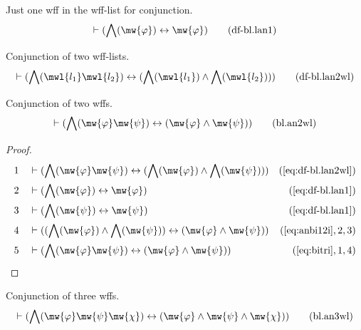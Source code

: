 \begin{metadefinition} {Just one wff in the wff-list for
conjunction.}
\begin{align}
\vdash ( \bigwedge( \mw{\varphi} ) \leftrightarrow \mw{\varphi}
    )\label{eq:df-bl.lan1}\tag{df-bl.lan1}
\end{align}
\end{metadefinition}


\begin{metadefinition} {Conjunction of two wff-lists.}
\begin{align}
\vdash ( \bigwedge( \mwl{l_1} \mwl{l_2} ) \leftrightarrow ( \bigwedge(
    \mwl{l_1} ) \wedge \bigwedge( \mwl{l_2} ) )
    )\label{eq:df-bl.lan2wl}\tag{df-bl.lan2wl}
\end{align}
\end{metadefinition}


\begin{lemma} {Conjunction of two wffs.}
\begin{align}
\vdash ( \bigwedge( \mw{\varphi} \mw{\psi} ) \leftrightarrow ( \mw{\varphi}
    \wedge \mw{\psi} ) )\label{eq:bl.an2wl}\tag{bl.an2wl}
\end{align}
\end{lemma}


\begin{proof}
\begin{align}
  1 &&  & \vdash ( \bigwedge( \mw{\varphi} \mw{\psi} ) \leftrightarrow (
     \bigwedge( \mw{\varphi} ) \wedge \bigwedge( \mw{\psi}
     ) ) )&(\mbox{\ref{eq:df-bl.lan2wl}})\notag
  \\ 2 &&  & \vdash ( \bigwedge( \mw{\varphi} ) \leftrightarrow \mw{\varphi}
     )&(\mbox{\ref{eq:df-bl.lan1}})\notag
  \\ 3 &&  & \vdash ( \bigwedge( \mw{\psi} ) \leftrightarrow \mw{\psi}
     )&(\mbox{\ref{eq:df-bl.lan1}})\notag
  \\ 4 &&  & \vdash ( ( \bigwedge( \mw{\varphi} ) \wedge \bigwedge( \mw{\psi} )
     ) \leftrightarrow ( \mw{\varphi} \wedge \mw{\psi} )
     )&(\mbox{\ref{eq:anbi12i}},2,3)\notag
  \\ 5 &&  & \vdash ( \bigwedge( \mw{\varphi} \mw{\psi} ) \leftrightarrow (
     \mw{\varphi} \wedge \mw{\psi} )
     )&(\mbox{\ref{eq:bitri}},1,4)\notag
\end{align}
\end{proof}

\begin{lemma} {Conjunction of three wffs.}
\begin{align}
\vdash ( \bigwedge( \mw{\varphi} \mw{\psi} \mw{\chi} ) \leftrightarrow (
    \mw{\varphi} \wedge \mw{\psi} \wedge \mw{\chi} )
    )\label{eq:bl.an3wl}\tag{bl.an3wl}
\end{align}
\end{lemma}


